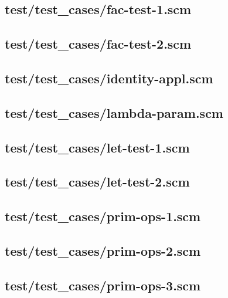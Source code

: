\documentclass{article}
\begin{document}
    \subsection{test/test\_cases/fac-test-1.scm}
    
    \subsection{test/test\_cases/fac-test-2.scm}
    
    \subsection{test/test\_cases/identity-appl.scm}
    
    \subsection{test/test\_cases/lambda-param.scm}
    
    \subsection{test/test\_cases/let-test-1.scm}
    
    \subsection{test/test\_cases/let-test-2.scm}
    
    \subsection{test/test\_cases/prim-ops-1.scm}
    
    \subsection{test/test\_cases/prim-ops-2.scm}
    
    \subsection{test/test\_cases/prim-ops-3.scm}
    
\end{document}
